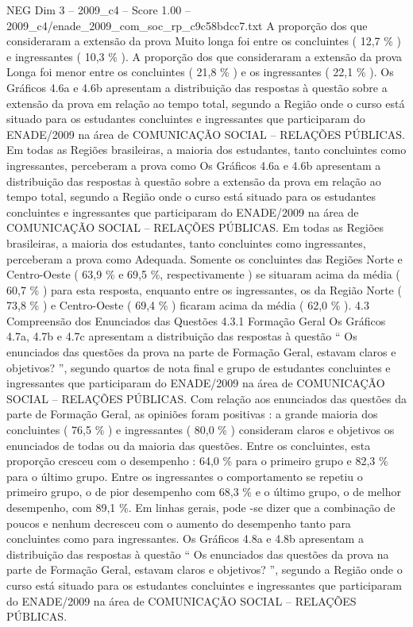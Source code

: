 \begin{textsample}{NEG Dim 3 – 2009\_c4 – Score 1.00 – 2009\_c4/enade\_2009\_com\_soc\_rp\_c9c58bdcc7.txt}
A proporção dos que consideraram a extensão da prova Muito longa foi entre os concluintes ( 12,7 \% ) e ingressantes ( 10,3 \% ).
A proporção dos que consideraram a extensão da prova Longa foi menor entre os concluintes ( 21,8 \% ) e os ingressantes ( 22,1 \% ).
Os Gráficos 4.6a e 4.6b apresentam a distribuição das respostas à questão sobre a extensão da prova em relação ao tempo total, segundo a Região onde o curso está situado para os estudantes concluintes e ingressantes que participaram do ENADE/2009 na área de COMUNICAÇÃO SOCIAL – RELAÇÕES PÚBLICAS.
Em todas as Regiões brasileiras, a maioria dos estudantes, tanto concluintes como ingressantes, perceberam a prova como Os Gráficos 4.6a e 4.6b apresentam a distribuição das respostas à questão sobre a extensão da prova em relação ao tempo total, segundo a Região onde o curso está situado para os estudantes concluintes e ingressantes que participaram do ENADE/2009 na área de COMUNICAÇÃO SOCIAL – RELAÇÕES PÚBLICAS.
Em todas as Regiões brasileiras, a maioria dos estudantes, tanto concluintes como ingressantes, perceberam a prova como Adequada.
Somente os concluintes das Regiões Norte e Centro-Oeste ( 63,9 \% e 69,5 \%, respectivamente ) se situaram acima da média ( 60,7 \% ) para esta resposta, enquanto entre os ingressantes, os da Região Norte ( 73,8 \% ) e Centro-Oeste ( 69,4 \% ) ficaram acima da média ( 62,0 \% ). 4.3 Compreensão dos Enunciados das Questões 4.3.1 Formação Geral Os Gráficos 4.7a, 4.7b e 4.7c apresentam a distribuição das respostas à questão “ Os enunciados das questões da prova na parte de Formação Geral, estavam claros e objetivos? ”, segundo quartos de nota final e grupo de estudantes concluintes e ingressantes que participaram do ENADE/2009 na área de COMUNICAÇÃO SOCIAL – RELAÇÕES PÚBLICAS.
Com relação aos enunciados das questões da parte de Formação Geral, as opiniões foram positivas : a grande maioria dos concluintes ( 76,5 \% ) e ingressantes ( 80,0 \% ) consideram claros e objetivos os enunciados de todas ou da maioria das questões.
Entre os concluintes, esta proporção cresceu com o desempenho : 64,0 \% para o primeiro grupo e 82,3 \% para o último grupo.
Entre os ingressantes o comportamento se repetiu o primeiro grupo, o de pior desempenho com 68,3 \% e o último grupo, o de melhor desempenho, com 89,1 \%.
Em linhas gerais, pode -se dizer que a combinação de poucos e nenhum decresceu com o aumento do desempenho tanto para concluintes como para ingressantes.
Os Gráficos 4.8a e 4.8b apresentam a distribuição das respostas à questão “ Os enunciados das questões da prova na parte de Formação Geral, estavam claros e objetivos? ”, segundo a Região onde o curso está situado para os estudantes concluintes e ingressantes que participaram do ENADE/2009 na área de COMUNICAÇÃO SOCIAL – RELAÇÕES PÚBLICAS.

\end{textsample}
